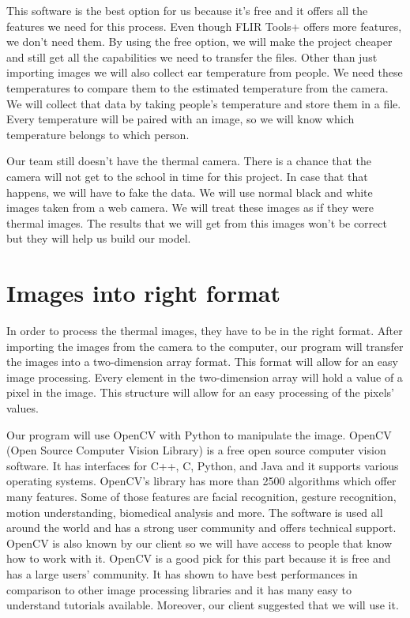 \documentclass[onecolumn, draftclsnofoot,10pt, compsoc]{IEEEtran}
\begin{document}
This software is the best option for us because it’s free and it offers all the features we need for this process. Even though FLIR Tools+ offers more features, we don’t need them. By using the free option, we will make the project cheaper and still get all the capabilities we need to transfer the files.
Other than just importing images we will also collect ear temperature from people. We need these temperatures to compare them to the estimated temperature from the camera. We will collect that data by taking people’s temperature and store them in a file. Every temperature will be paired with an image, so we will know which temperature belongs to which person. 

Our team still doesn’t have the thermal camera. There is a chance that the camera will not get to the school in time for this project. In case that that happens, we will have to fake the data. We will use normal black and white images taken from a web camera. We will treat these images as if they were thermal images. The results that we will get from this images won’t be correct but they will help us build our model. 


\section{Images into right format}

In order to process the thermal images, they have to be in the right format. After importing the images from the camera to the computer, our program will transfer the images into a two-dimension array format. This format will allow for an easy image processing. Every element in the two-dimension array will hold a value of a pixel in the image. This structure will allow for an easy processing of the pixels’ values. 

Our program will use OpenCV with Python to manipulate the image.  OpenCV (Open Source Computer Vision Library) is a free open source computer vision software. It has interfaces for C++, C, Python, and Java and it supports various operating systems. OpenCV’s library has more than 2500 algorithms which offer many features. Some of those features are facial recognition, gesture recognition, motion understanding, biomedical analysis and more. The software is used all around the world and has a strong user community and offers technical support. OpenCV is also known by our client so we will have access to people that know how to work with it. OpenCV is a good pick for this part because it is free and has a large users’ community. It has shown to have best performances in comparison to other image processing libraries and it has many easy to understand tutorials available. Moreover, our client suggested that we will use it.\cite{ClaudeTech}
\end{document}
